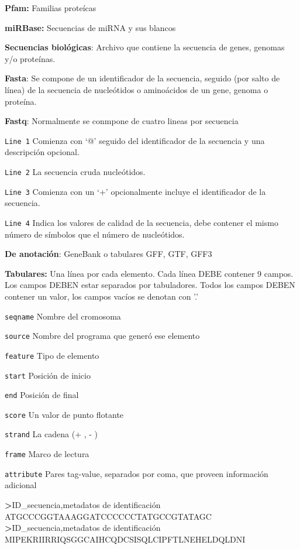 \documentclass[
]{book}
\newenvironment{Shaded}{\begin{snugshade}}{\end{snugshade}}
\newcommand{\ExtensionTok}[1]{#1}
\newcommand{\NormalTok}[1]{#1}
\newcommand{\OperatorTok}[1]{\textcolor[rgb]{0.81,0.36,0.00}{\textbf{#1}}}
\begin{document}
\textbf{Pfam:} Familias proteícas

\textbf{miRBase:} Secuencias de miRNA y sus blancos

\textbf{Secuencias biológicas}: Archivo que contiene la secuencia de genes, genomas y/o proteínas.

\textbf{Fasta}: Se compone de un identificador de la secuencia, seguido (por salto de línea) de la
secuencia de nucleótidos o aminoácidos de un gene, genoma o proteína.

\textbf{Fastq}: Normalmente se conmpone de cuatro lineas por secuencia

\texttt{Line\ 1} Comienza con `@' seguido del identificador de la secuencia y una descripción opcional.

\texttt{Line\ 2} La secuencia cruda nucleótidos.

\texttt{Line\ 3} Comienza con un `+' opcionalmente incluye el identificador de la secuencia.

\texttt{Line\ 4} Indica los valores de calidad de la secuencia, debe contener el mismo número de símbolos que el número de nucleótidos.

\textbf{De anotación}: GeneBank o tabulares GFF, GTF, GFF3

\textbf{Tabulares:} Una línea por cada elemento. Cada línea DEBE contener 9 campos. Los campos DEBEN estar separados por tabuladores. Todos los campos DEBEN contener un valor, los campos vacíos se denotan con '.'

\texttt{seqname} Nombre del cromosoma

\texttt{source} Nombre del programa que generó ese elemento

\texttt{feature} Tipo de elemento

\texttt{start} Posición de inicio

\texttt{end} Posición de final

\texttt{score} Un valor de punto flotante

\texttt{strand} La cadena (+ , - )

\texttt{frame} Marco de lectura

\texttt{attribute} Pares tag-value, separados por coma, que proveen información
adicional

\begin{Shaded}
\begin{Highlighting}[]
\OperatorTok{\textgreater{}}\NormalTok{ID\_secuencia,metadatos }\ExtensionTok{de}\NormalTok{ identificación}
\ExtensionTok{ATGCCCGGTAAAGGATCCCCCCTATGCCGTATAGC}
\OperatorTok{\textgreater{}}\NormalTok{ID\_secuencia,metadatos }\ExtensionTok{de}\NormalTok{ identificación}
\ExtensionTok{MIPEKRIIRRIQSGGCAIHCQDCSISQLCIPFTLNEHELDQLDNI}
\end{Highlighting}
\end{Shaded}
\end{document}
